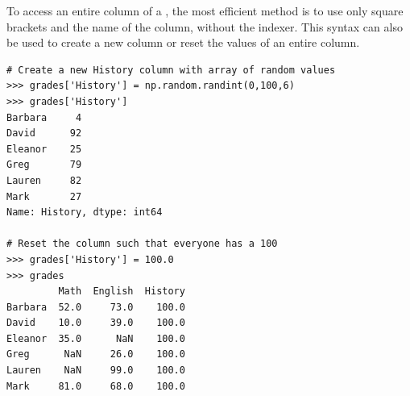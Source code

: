 To access an entire column of a , the most efficient method is to use only square brackets and the name of the column, without the indexer.
This syntax can also be used to create a new column or reset the values of an entire column.

\begin{lstlisting}
# Create a new History column with array of random values
>>> grades['History'] = np.random.randint(0,100,6)
>>> grades['History']
Barbara     4
David      92
Eleanor    25
Greg       79
Lauren     82
Mark       27
Name: History, dtype: int64

# Reset the column such that everyone has a 100
>>> grades['History'] = 100.0
>>> grades
         Math  English  History
Barbara  52.0     73.0    100.0
David    10.0     39.0    100.0
Eleanor  35.0      NaN    100.0
Greg      NaN     26.0    100.0
Lauren    NaN     99.0    100.0
Mark     81.0     68.0    100.0
\end{lstlisting}

